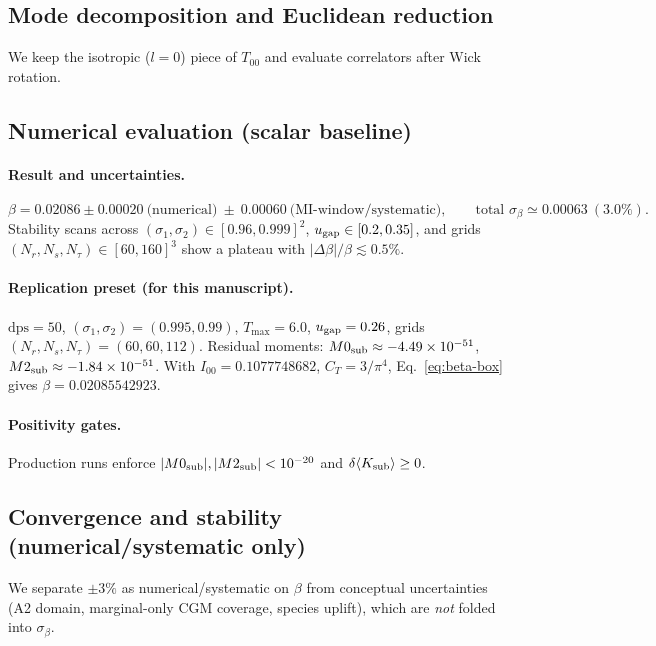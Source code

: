 \documentclass[aps,prd,onecolumn,superscriptaddress,nofootinbib]{revtex4-2}
\begin{document}
\subsection{Mode decomposition and Euclidean reduction}
We keep the isotropic ($l=0$) piece of $T_{00}$ and evaluate correlators after Wick rotation.

\subsection{Numerical evaluation (scalar baseline)}
\paragraph*{Result and uncertainties.}
\begin{equation}
\beta = 0.02086 \pm 0.00020\ \text{(numerical)} \ \pm\ 0.00060\ \text{(MI-window/systematic)},\qquad \text{total }\sigma_\beta \simeq 0.00063~(3.0\%).
\end{equation}
Stability scans across $(\sigma_1,\sigma_2)\in[0.96,0.999]^2$, $u_{\rm gap}\in[0.2,0.35]$, and grids $(N_r,N_s,N_\tau)\in[60,160]^3$ show a plateau with $|\Delta\beta|/\beta \lesssim 0.5\%$.

\paragraph*{Replication preset (for this manuscript).}
$\mathrm{dps}=50$, $(\sigma_1,\sigma_2)=(0.995,0.99)$, $T_{\max}=6.0$, $u_{\rm gap}=0.26$, grids $(N_r,N_s,N_\tau)=(60,60,112)$. Residual moments: $M0_{\rm sub}\approx-4.49\times 10^{-51}$, $M2_{\rm sub}\approx-1.84\times 10^{-51}$. With $I_{00}=0.1077748682$, $C_T=3/\pi^4$, Eq.~\eqref{eq:beta-box} gives $\beta=0.02085542923$.

\paragraph*{Positivity gates.}
Production runs enforce $|M0_{\rm sub}|,|M2_{\rm sub}|<10^{-20}$ and $\delta\langle K_{\rm sub}\rangle \ge 0$.

\subsection{Convergence and stability (numerical/systematic only)}
\label{sec:convergence}
We separate $\pm3\%$ as numerical/systematic on $\beta$ from conceptual uncertainties (A2 domain, marginal-only CGM coverage, species uplift), which are \emph{not} folded into $\sigma_\beta$.
\end{document}
